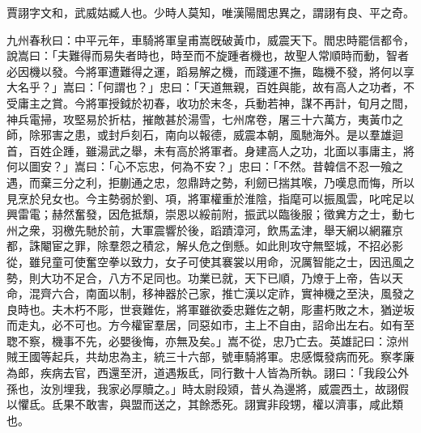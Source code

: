 
\begin{pinyinscope}
賈詡字文和，武威姑臧人也。少時人莫知，唯漢陽閻忠異之，謂詡有良、平之奇。

九州春秋曰：中平元年，車騎將軍皇甫嵩旣破黃巾，威震天下。閻忠時罷信都令，說嵩曰：「夫難得而易失者時也，時至而不旋踵者機也，故聖人常順時而動，智者必因機以發。今將軍遭難得之運，蹈易解之機，而踐運不撫，臨機不發，將何以享大名乎？」嵩曰：「何謂也？」忠曰：「天道無親，百姓與能，故有高人之功者，不受庸主之賞。今將軍授鉞於初春，收功於末冬，兵動若神，謀不再計，旬月之間，神兵電掃，攻堅易於折枯，摧敵甚於湯雪，七州席卷，屠三十六萬方，夷黃巾之師，除邪害之患，或封戶刻石，南向以報德，威震本朝，風馳海外。是以羣雄迴首，百姓企踵，雖湯武之舉，未有高於將軍者。身建高人之功，北面以事庸主，將何以圖安？」嵩曰：「心不忘忠，何為不安？」忠曰：「不然。昔韓信不忍一飱之遇，而棄三分之利，拒蒯通之忠，忽鼎跱之勢，利劒已揣其喉，乃嘆息而悔，所以見烹於兒女也。今主勢弱於劉、項，將軍權重於淮陰，指麾可以振風雲，叱咤足以興雷電；赫然奮發，因危抵頹，崇恩以綏前附，振武以臨後服；徵兾方之士，動七州之衆，羽檄先馳於前，大軍震響於後，蹈蹟漳河，飲馬孟津，舉天網以網羅京都，誅閹宦之罪，除羣怨之積忿，解乆危之倒懸。如此則攻守無堅城，不招必影從，雖兒童可使奮空拳以致力，女子可使其褰裳以用命，況厲智能之士，因迅風之勢，則大功不足合，八方不足同也。功業已就，天下已順，乃燎于上帝，告以天命，混齊六合，南面以制，移神器於己家，推亡漢以定祚，實神機之至決，風發之良時也。夫木朽不彫，世衰難佐，將軍雖欲委忠難佐之朝，彫畫朽敗之木，猶逆坂而走丸，必不可也。方今權宦羣居，同惡如市，主上不自由，詔命出左右。如有至聦不察，機事不先，必嬰後悔，亦無及矣。」嵩不從，忠乃亡去。英雄記曰：涼州賊王國等起兵，共劫忠為主，統三十六部，號車騎將軍。忠感慨發病而死。察孝廉為郎，疾病去官，西還至汧，道遇叛氐，同行數十人皆為所執。詡曰：「我段公外孫也，汝別埋我，我家必厚贖之。」時太尉段熲，昔乆為邊將，威震西土，故詡假以懼氐。氐果不敢害，與盟而送之，其餘悉死。詡實非段甥，權以濟事，咸此類也。


\end{pinyinscope}
